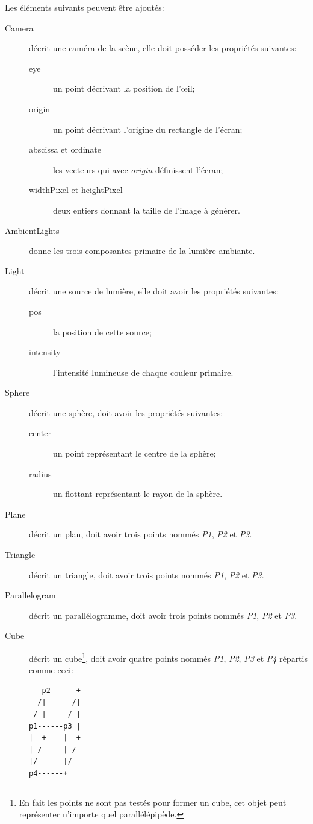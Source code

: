 \documentclass[a4paper]{article}
\begin{document}
    Les éléments suivants peuvent être ajoutés:
    \begin{description}
      \item[Camera] décrit une caméra de la scène, elle doit posséder les
        propriétés suivantes:
        \begin{description}
          \item[eye] un point décrivant la position de l'œil;
          \item[origin] un point décrivant l'origine du rectangle de l'écran;
          \item[abscissa et ordinate] les vecteurs qui avec \textit{origin}
            définissent l'écran;
          \item[widthPixel et heightPixel] deux entiers donnant la taille de
            l'image à générer. 
        \end{description}
      \item[AmbientLights] donne les trois composantes primaire de la lumière
        ambiante.
      \item[Light] décrit une source de lumière, elle doit avoir les propriétés
        suivantes:
        \begin{description}
          \item[pos] la position de cette source;
          \item[intensity] l'intensité lumineuse de chaque couleur primaire.
        \end{description}
      \item[Sphere] décrit une sphère, doit avoir les propriétés suivantes:
        \begin{description}
          \item[center] un point représentant le centre de la sphère;
          \item[radius] un flottant représentant le rayon de la sphère.
        \end{description}
      \item[Plane] décrit un plan, doit avoir trois points nommés \textit{P1},
        \textit{P2} et \textit{P3}.
      \item[Triangle] décrit un triangle, doit avoir trois points nommés
        \textit{P1}, \textit{P2} et \textit{P3}.
      \item[Parallelogram] décrit un parallélogramme, doit avoir trois points
        nommés \textit{P1}, \textit{P2} et \textit{P3}.
      \item[Cube] décrit un cube\footnote{En fait les points ne sont pas testés
        pour former un cube, cet objet peut représenter n'importe quel
        parallélépipède.}, doit avoir quatre points nommés
        \textit{P1}, \textit{P2}, \textit{P3} et \textit{P4} répartis comme
        ceci: \begin{lstlisting}
   p2------+
  /|      /|
 / |     / |
p1------p3 |
|  +----|--+
| /     | /
|/      |/
p4------+
        \end{lstlisting}
    \end{description}
\end{document}
